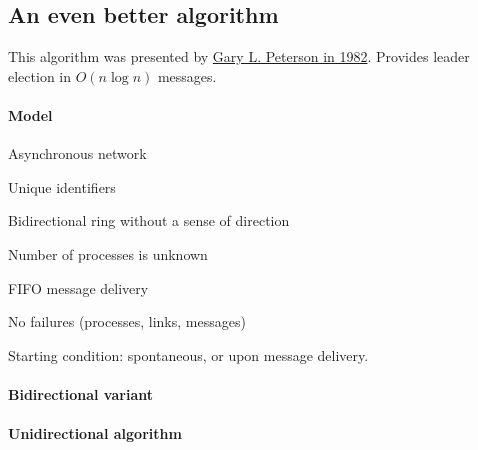\documentclass{idc_msc}
\begin{document}

\subsection{An even better algorithm}
This algorithm was presented by \href{http://dl.acm.org/citation.cfm?id=357194}{Gary L. Peterson in 1982}.
Provides leader election in $O(n \log n)$ messages.

\paragraph{Model}

\begin{itemize*}
  \item Asynchronous network
  \item Unique identifiers
  \item Bidirectional ring without a sense of direction
  \item Number of processes is unknown
  \item FIFO message delivery
  \item No failures (processes, links, messages)
  \item Starting condition: spontaneous, or upon message delivery.
\end{itemize*}


\paragraph{Bidirectional variant}


\paragraph{Unidirectional algorithm}


\end{document}
